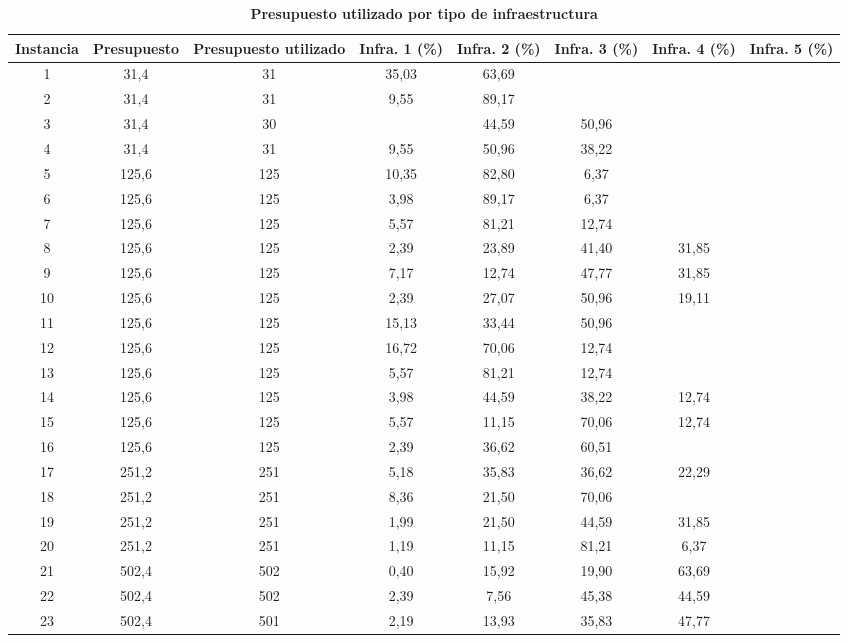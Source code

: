 \documentclass{article}
\begin{document}
  \begin{table}
    \centering
    \caption*{{\bf Presupuesto utilizado por tipo de infraestructura}}
    \begin{tabular}{cccccccc}
        \toprule
        Instancia & Presupuesto & Presupuesto utilizado & Infra. 1 (\%) & Infra. 2 (\%) & Infra. 3 (\%) & Infra. 4 (\%) & Infra. 5 (\%) \\
        \midrule
        1 & 31,4 & 31 & 35,03 & 63,69 &  &  &  \\
        2 & 31,4 & 31 & 9,55 & 89,17 &  &  &  \\
        3 & 31,4 & 30 &  & 44,59 & 50,96 &  &  \\
        4 & 31,4 & 31 & 9,55 & 50,96 & 38,22 &  &  \\
        5 & 125,6 & 125 & 10,35 & 82,80 & 6,37 &  &  \\
        6 & 125,6 & 125 & 3,98 & 89,17 & 6,37 &  &  \\
        7 & 125,6 & 125 & 5,57 & 81,21 & 12,74 &  &  \\
        8 & 125,6 & 125 & 2,39 & 23,89 & 41,40 & 31,85 &  \\
        9 & 125,6 & 125 & 7,17 & 12,74 & 47,77 & 31,85 &  \\
        10 & 125,6 & 125 & 2,39 & 27,07 & 50,96 & 19,11 &  \\
        11 & 125,6 & 125 & 15,13 & 33,44 & 50,96 &  &  \\
        12 & 125,6 & 125 & 16,72 & 70,06 & 12,74 &  &  \\
        13 & 125,6 & 125 & 5,57 & 81,21 & 12,74 &  &  \\
        14 & 125,6 & 125 & 3,98 & 44,59 & 38,22 & 12,74 &  \\
        15 & 125,6 & 125 & 5,57 & 11,15 & 70,06 & 12,74 &  \\
        16 & 125,6 & 125 & 2,39 & 36,62 & 60,51 &  &  \\
        17 & 251,2 & 251 & 5,18 & 35,83 & 36,62 & 22,29 &  \\
        18 & 251,2 & 251 & 8,36 & 21,50 & 70,06 &  &  \\
        19 & 251,2 & 251 & 1,99 & 21,50 & 44,59 & 31,85 &  \\
        20 & 251,2 & 251 & 1,19 & 11,15 & 81,21 & 6,37 &  \\
        21 & 502,4 & 502 & 0,40 & 15,92 & 19,90 & 63,69 &  \\
        22 & 502,4 & 502 & 2,39 & 7,56 & 45,38 & 44,59 &  \\
        23 & 502,4 & 501 & 2,19 & 13,93 & 35,83 & 47,77 &  \\

\end{tabular}
\end{table}
\end{document}

